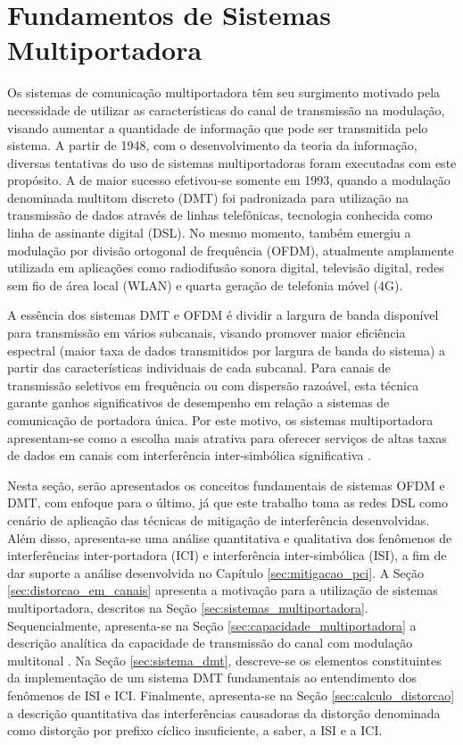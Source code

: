 \chapter{Fundamentos de Sistemas Multiportadora}
\label{sec:fundamentos_dmt}

Os sistemas de comunicação multiportadora têm seu surgimento motivado pela necessidade de utilizar as características do canal de transmissão na modulação, visando aumentar a quantidade de informação que pode ser transmitida pelo sistema. A partir de 1948, com o desenvolvimento da teoria da informação, diversas tentativas do uso de sistemas multiportadoras foram executadas com este propósito. A de maior sucesso efetivou-se somente em 1993, quando a modulação denominada multitom discreto (DMT) foi padronizada para utilização na transmissão de dados através de linhas telefônicas, tecnologia conhecida como linha de assinante digital (DSL). No mesmo momento, também emergiu a modulação por divisão ortogonal de frequência (OFDM), atualmente amplamente utilizada em aplicações como radiodifusão sonora digital, televisão digital, redes sem fio de área local (WLAN) e quarta geração de telefonia móvel (4G).

A essência dos sistemas DMT e OFDM é dividir a largura de banda disponível para transmissão em vários subcanais, visando promover maior eficiência espectral (maior taxa de dados transmitidos por largura de banda do sistema) a partir das características individuais de cada subcanal. Para canais de transmissão seletivos em frequência ou com dispersão razoável, esta técnica garante ganhos significativos de desempenho em relação a sistemas de comunicação de portadora única. Por este motivo, os sistemas multiportadora apresentam-se como a escolha mais atrativa para oferecer serviços de altas taxas de dados em canais com interferência inter-simbólica significativa \cite{ee379c}.

Nesta seção, serão apresentados os conceitos fundamentais de sistemas OFDM e DMT, com enfoque para o último, já que este trabalho toma as redes DSL como cenário de aplicação das técnicas de mitigação de interferência desenvolvidas. Além disso, apresenta-se uma análise quantitativa e qualitativa dos fenômenos de interferências inter-portadora (ICI) e interferência inter-simbólica (ISI), a fim de dar suporte a análise desenvolvida no Capítulo \ref{sec:mitigacao_pci}. A Seção \ref{sec:distorcao_em_canais} apresenta a motivação para a utilização de sistemas multiportadora, descritos na Seção \ref{sec:sistemas_multiportadora}. Sequencialmente, apresenta-se na Seção \ref{sec:capacidade_multiportadora} a descrição analítica da capacidade de transmissão do canal com modulação multitonal . Na Seção \ref{sec:sistema_dmt}, descreve-se os elementos constituintes da implementação de um sistema DMT fundamentais ao entendimento dos fenômenos de ISI e ICI. Finalmente, apresenta-se na Seção \ref{sec:calculo_distorcao} a descrição quantitativa das interferências causadoras da distorção denominada como distorção por prefixo cíclico insuficiente, a saber, a ISI e a ICI.

